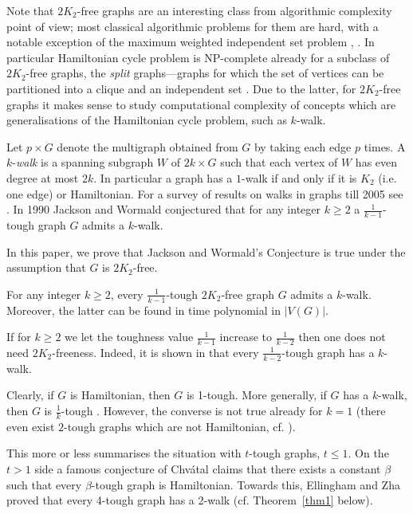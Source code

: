 \documentclass[runningheads,a4paper]{llncs}
\begin{document}
Note that $2K_2$-free graphs are an interesting 
class from algorithmic complexity point of view; most classical algorithmic problems for them are
hard, with a notable exception of the maximum weighted independent set problem 
\cite{balasyu1989}, \cite[Graphclass: $2K_2$-free]{isgci}. In particular 
Hamiltonian cycle problem is NP-complete already for a subclass of $2K_2$-free graphs, 
the {\em split} graphs---graphs for which the set of vertices can be partitioned into
a clique and an independent set \cite[Exercise 6.2]{Golum}.
Due to the latter,  for $2K_2$-free graphs it makes sense to study computational complexity 
of concepts which are generalisations of the Hamiltonian cycle 
problem, such as $k$-walk.

Let $p\times G$ denote the multigraph obtained from $G$ by taking each edge $p$ times. 
A $k$-{\em walk} is a spanning subgraph $W$ of $2k\times G$ such that each vertex of $W$ 
has even degree at most $2k$. %
In particular a graph has a $1$-walk if and only if it is $K_2$ (i.e. one edge) or Hamiltonian.
{For a survey of results on walks in graphs till 2005 see \cite{kouider2005connected}.}
In 1990 Jackson and Wormald conjectured \cite{jackson1990k} that for any integer $k\ge2$ a
$\frac{1}{k-1}$-tough graph $G$ admits a $k$-walk.

In this paper, we prove that Jackson and Wormald's Conjecture is true under the
assumption that $G$ is  $2K_2$-free.

\begin{theorem}\label{thm2} 
For any integer $k\ge2$, every $\frac{1}{k-1}$-tough $2K_2$-free graph $G$
admits a $k$-walk.
Moreover, the latter can be found in time polynomial in $|V(G)|$.
\end{theorem}

If for $k\geq 2$ we let the toughness value $\frac{1}{k-1}$ increase to
$\frac{1}{k-2}$ then
one does not need $2K_2$-freeness. Indeed, it is shown in
\cite{jackson1990k} that
every $\frac{1}{k-2}$-tough graph has a $k$-walk.

Clearly, if $G$ is
Hamiltonian, then $G$ is 1-tough.  More generally,
if $G$ has a $k$-walk, then $G$ is $\frac{1}{k}$-tough \cite{jackson1990k}.
However, the converse is not true already for $k=1$ (there even exist $2$-tough graphs which are
not Hamiltonian, cf. \cite{bauer2000not}).

This more or less summarises the situation with $t$-tough graphs, $t\leq 1$.
On the $t>1$ side 
a famous conjecture of Chv\'{a}tal \cite{chvatal1973tough} claims
that there exists a constant $\beta$ such that every
$\beta$-tough graph is Hamiltonian.  
Towards this, 
Ellingham and Zha \cite{ellingham2000toughness} proved that
every 4-tough graph has a 2-walk (cf. Theorem~\ref{thm1} below).
\end{document}
